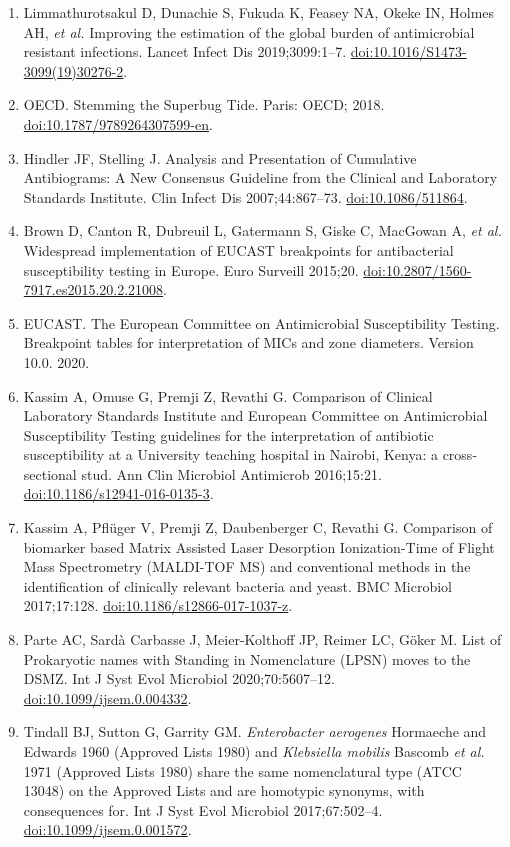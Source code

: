 \documentclass[
]{book}
\providecommand{\tightlist}{%
  \setlength{\itemsep}{0pt}\setlength{\parskip}{0pt}}
\begin{document}
\begin{enumerate}
\def\labelenumi{\arabic{enumi}.}
\tightlist
\item
  Limmathurotsakul D, Dunachie S, Fukuda K, Feasey NA, Okeke IN, Holmes AH, \emph{et al.} Improving the estimation of the global burden of antimicrobial resistant infections. Lancet Infect Dis 2019;3099:1--7. \url{doi:10.1016/S1473-3099(19)30276-2}.
\item
  OECD. Stemming the Superbug Tide. Paris: OECD; 2018. \url{doi:10.1787/9789264307599-en}.
\item
  Hindler JF, Stelling J. Analysis and Presentation of Cumulative Antibiograms: A New Consensus Guideline from the Clinical and Laboratory Standards Institute. Clin Infect Dis 2007;44:867--73. \url{doi:10.1086/511864}.
\item
  Brown D, Canton R, Dubreuil L, Gatermann S, Giske C, MacGowan A, \emph{et al.} Widespread implementation of EUCAST breakpoints for antibacterial susceptibility testing in Europe. Euro Surveill 2015;20. \url{doi:10.2807/1560-7917.es2015.20.2.21008}.
\item
  EUCAST. The European Committee on Antimicrobial Susceptibility Testing. Breakpoint tables for interpretation of MICs and zone diameters. Version 10.0. 2020.
\item
  Kassim A, Omuse G, Premji Z, Revathi G. Comparison of Clinical Laboratory Standards Institute and European Committee on Antimicrobial Susceptibility Testing guidelines for the interpretation of antibiotic susceptibility at a University teaching hospital in Nairobi, Kenya: a cross-sectional stud. Ann Clin Microbiol Antimicrob 2016;15:21. \url{doi:10.1186/s12941-016-0135-3}.
\item
  Kassim A, Pflüger V, Premji Z, Daubenberger C, Revathi G. Comparison of biomarker based Matrix Assisted Laser Desorption Ionization-Time of Flight Mass Spectrometry (MALDI-TOF MS) and conventional methods in the identification of clinically relevant bacteria and yeast. BMC Microbiol 2017;17:128. \url{doi:10.1186/s12866-017-1037-z}.
\item
  Parte AC, Sardà Carbasse J, Meier-Kolthoff JP, Reimer LC, Göker M. List of Prokaryotic names with Standing in Nomenclature (LPSN) moves to the DSMZ. Int J Syst Evol Microbiol 2020;70:5607--12. \url{doi:10.1099/ijsem.0.004332}.
\item
  Tindall BJ, Sutton G, Garrity GM. \emph{Enterobacter aerogenes} Hormaeche and Edwards 1960 (Approved Lists 1980) and \emph{Klebsiella mobilis} Bascomb \emph{et al.} 1971 (Approved Lists 1980) share the same nomenclatural type (ATCC 13048) on the Approved Lists and are homotypic synonyms, with consequences for. Int J Syst Evol Microbiol 2017;67:502--4. \url{doi:10.1099/ijsem.0.001572}.

\end{enumerate}
\end{document}
